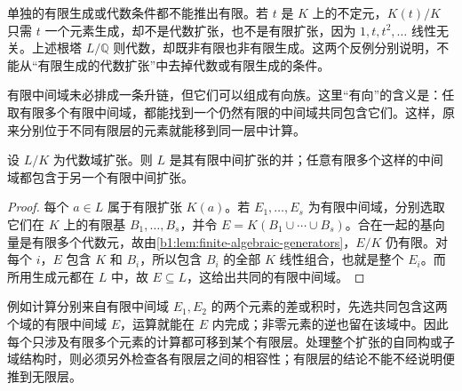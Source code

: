 \ProseParagraphBreak
单独的有限生成或代数条件都不能推出有限。若 \(t\) 是 \(K\) 上的不定元，\(K(t)/K\) 只需 \(t\) 一个元素生成，却不是代数扩张，也不是有限扩张，因为 \(1,t,t^2,\ldots\) 线性无关。上述根塔 \(L/\mathbb Q\) 则代数，却既非有限也非有限生成。这两个反例分别说明，不能从“有限生成的代数扩张”中去掉代数或有限生成的条件。

\ProseParagraphBreak
有限中间域未必排成一条升链，但它们可以组成有向族。这里“有向”的含义是：任取有限多个有限中间域，都能找到一个仍然有限的中间域共同包含它们。这样，原来分别位于不同有限层的元素就能移到同一层中计算。

\begin{proposition}\label{b1:prop:algebraic-directed-union}
	设 \(L/K\) 为代数域扩张。则 \(L\) 是其有限中间扩张的并；任意有限多个这样的中间域都包含于另一个有限中间扩张。
\end{proposition}
\begin{proof}
	每个 \(a\in L\) 属于有限扩张 \(K(a)\)。若 \(E_1,\ldots,E_s\) 为有限中间域，分别选取它们在 \(K\) 上的有限基 \(B_1,\ldots,B_s\)，并令 \(E=K(B_1\cup\cdots\cup B_s)\)。合在一起的基向量是有限多个代数元，故由\cref{b1:lem:finite-algebraic-generators}，\(E/K\) 仍有限。对每个 \(i\)，\(E\) 包含 \(K\) 和 \(B_i\)，所以包含 \(B_i\) 的全部 \(K\) 线性组合，也就是整个 \(E_i\)。而所用生成元都在 \(L\) 中，故 \(E\subseteq L\)，这给出共同的有限中间域。
\end{proof}
例如计算分别来自有限中间域 \(E_1,E_2\) 的两个元素的差或积时，先选共同包含这两个域的有限中间域 \(E\)，运算就能在 \(E\) 内完成；非零元素的逆也留在该域中。因此每个只涉及有限多个元素的计算都可移到某个有限层。处理整个扩张的自同构或子域结构时，则必须另外检查各有限层之间的相容性；有限层的结论不能不经说明便推到无限层。

